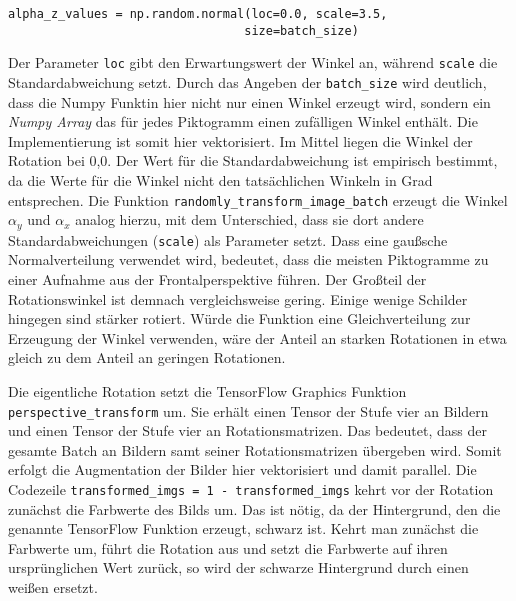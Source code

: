 \begin{code}
   \begin{verbatim}
alpha_z_values = np.random.normal(loc=0.0, scale=3.5, 
                                 size=batch_size)
\end{verbatim}
   \label{lst:alpha-z-value}
   \end{code}

Der Parameter \texttt{loc} gibt den Erwartungswert der Winkel an, während \texttt{scale} die Standardabweichung setzt. Durch das Angeben der \texttt{batch_size} wird deutlich, dass die Numpy Funktin hier nicht nur einen Winkel erzeugt wird, sondern ein \emph{Numpy Array} das für jedes Piktogramm einen zufälligen Winkel enthält. Die Implementierung ist somit hier vektorisiert. Im Mittel liegen die Winkel der Rotation bei 0,0\textdegree. Der Wert für die Standardabweichung ist empirisch bestimmt, da die Werte für die Winkel nicht den tatsächlichen Winkeln in Grad entsprechen. Die Funktion \texttt{randomly_transform_image_batch} erzeugt die Winkel $\alpha_y$ und $\alpha_x$ analog hierzu, mit dem Unterschied, dass sie dort andere Standardabweichungen (\texttt{scale}) als Parameter setzt. Dass eine gaußsche Normalverteilung verwendet wird, bedeutet, dass die meisten Piktogramme zu einer Aufnahme aus der Frontalperspektive führen. Der Großteil der Rotationswinkel ist demnach vergleichsweise gering. Einige wenige Schilder hingegen sind stärker rotiert. Würde die Funktion eine Gleichverteilung zur Erzeugung der Winkel verwenden, wäre der Anteil an starken Rotationen in etwa gleich zu dem Anteil an geringen Rotationen.

Die eigentliche Rotation setzt die TensorFlow Graphics Funktion \texttt{perspective_transform} um. Sie erhält einen Tensor der Stufe vier an Bildern und einen Tensor der Stufe vier an Rotationsmatrizen. Das bedeutet, dass der gesamte Batch an Bildern samt seiner Rotationsmatrizen übergeben wird. Somit erfolgt die Augmentation der Bilder hier vektorisiert und damit parallel. Die Codezeile \texttt{transformed_imgs = 1 - transformed_imgs} kehrt vor der Rotation zunächst die Farbwerte des Bilds um. Das ist nötig, da der Hintergrund, den die genannte TensorFlow Funktion erzeugt, schwarz ist. Kehrt man zunächst die Farbwerte um, führt die Rotation aus und setzt die Farbwerte auf ihren ursprünglichen Wert zurück, so wird der schwarze Hintergrund durch einen weißen ersetzt.